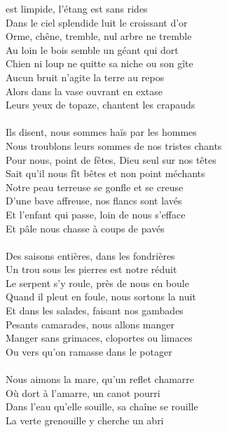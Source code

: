 
 est limpide, l'étang est sans rides
\\Dans le ciel splendide luit le croissant d'or
\\Orme, chêne, tremble, nul arbre ne tremble
\\Au loin le bois semble un géant qui dort
\\Chien ni loup ne quitte sa niche ou son gîte
\\Aucun bruit n'agite la terre au repos
\\Alors dans la vase ouvrant en extase
\\Leurs yeux de topaze, chantent les crapauds
\\\\Ils disent, nous sommes haïs par les hommes
\\Nous troublons leurs sommes de nos tristes chants
\\Pour nous, point de fêtes, Dieu seul sur nos têtes
\\Sait qu'il nous fît bêtes et non point méchants
\\Notre peau terreuse se gonfle et se creuse
\\D'une bave affreuse, nos flancs sont lavés
\\Et l'enfant qui passe, loin de nous s'efface
\\Et pâle nous chasse à coups de pavés
\\\\Des saisons entières, dans les fondrières
\\Un trou sous les pierres est notre réduit
\\Le serpent s'y roule, près de nous en boule
\\Quand il pleut en foule, nous sortons la nuit
\\Et dans les salades, faisant nos gambades
\\Pesants camarades, nous allons manger
\\Manger sans grimaces, cloportes ou limaces
\\Ou vers qu'on ramasse dans le potager
\\\\Nous aimons la mare, qu'un reflet chamarre
\\Où dort à l'amarre, un canot pourri
\\Dans l'eau qu'elle souille, sa chaîne se rouille
\\La verte grenouille y cherche un abri
